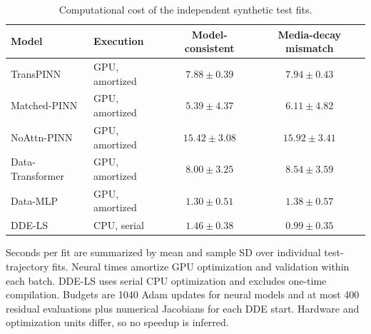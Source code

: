 \begin{table}[t]
\centering
\caption{Computational cost of the independent synthetic test fits.}
\label{tab:synthetic_runtime}
\footnotesize
\setlength{\tabcolsep}{4pt}
\renewcommand{\arraystretch}{1.08}
\begin{tabular*}{\textwidth}{@{\extracolsep{\fill}}llcc@{}}
\toprule
Model & Execution & Model-consistent & Media-decay mismatch \\
\midrule
TransPINN & GPU, amortized & $7.88\pm0.39$ & $7.94\pm0.43$ \\
Matched-PINN & GPU, amortized & $5.39\pm4.37$ & $6.11\pm4.82$ \\
NoAttn-PINN & GPU, amortized & $15.42\pm3.08$ & $15.92\pm3.41$ \\
Data-Transformer & GPU, amortized & $8.00\pm3.25$ & $8.54\pm3.59$ \\
Data-MLP & GPU, amortized & $1.30\pm0.51$ & $1.38\pm0.57$ \\
DDE-LS & CPU, serial & $1.46\pm0.38$ & $0.99\pm0.35$ \\
\bottomrule
\end{tabular*}
\par\smallskip
\begin{minipage}{\textwidth}\footnotesize Seconds per fit are summarized by mean and sample SD over individual test-trajectory fits. Neural times amortize GPU optimization and validation within each batch. DDE-LS uses serial CPU optimization and excludes one-time compilation. Budgets are 1040 Adam updates for neural models and at most 400 residual evaluations plus numerical Jacobians for each DDE start. Hardware and optimization units differ, so no speedup is inferred.\end{minipage}
\end{table}
